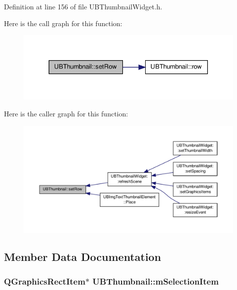 Definition at line 156 of file U\-B\-Thumbnail\-Widget.\-h.



Here is the call graph for this function\-:
\nopagebreak
\begin{figure}[H]
\begin{center}
\leavevmode
\includegraphics[width=330pt]{de/d65/class_u_b_thumbnail_ae5f3a2b52f87e1e3c3ed51ce4a045912_cgraph}
\end{center}
\end{figure}




Here is the caller graph for this function\-:
\nopagebreak
\begin{figure}[H]
\begin{center}
\leavevmode
\includegraphics[width=350pt]{de/d65/class_u_b_thumbnail_ae5f3a2b52f87e1e3c3ed51ce4a045912_icgraph}
\end{center}
\end{figure}




\subsection{Member Data Documentation}
\hypertarget{class_u_b_thumbnail_a40a2d16aea31b6963a83a32fc282a049}{
\subsubsection[{m\-Selection\-Item}]{\setlength{\rightskip}{0pt plus 5cm}Q\-Graphics\-Rect\-Item$\ast$ U\-B\-Thumbnail\-::m\-Selection\-Item\hspace{0.3cm}{\ttfamily [protected]}}}\label{de/d65/class_u_b_thumbnail_a40a2d16aea31b6963a83a32fc282a049}


